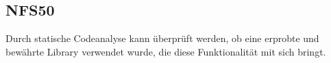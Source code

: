 \subsection*{NFS50}
Durch statische Codeanalyse kann überprüft werden, ob eine erprobte und bewährte Library verwendet wurde,
die diese Funktionalität mit sich bringt.